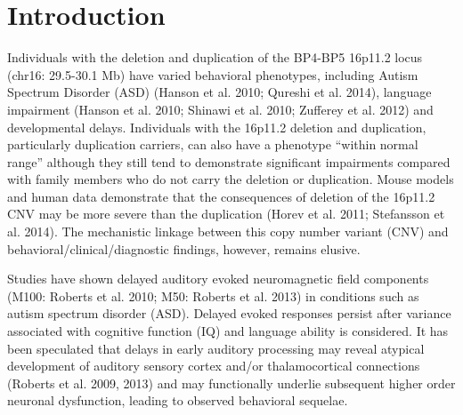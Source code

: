 \documentclass{article}
\begin{document}
\pagebreak

\section{Introduction}

Individuals with the deletion and duplication of the BP4-BP5 16p11.2 locus (chr16: 29.5-30.1 Mb) have varied behavioral phenotypes, including Autism Spectrum Disorder (ASD) (Hanson et al. 2010; Qureshi et al. 2014), language impairment (Hanson et al. 2010; Shinawi et al. 2010; Zufferey et al. 2012) and developmental delays. Individuals with the 16p11.2 deletion and duplication, particularly duplication carriers, can also have a phenotype “within normal range” although they still tend to demonstrate significant impairments compared with family members who do not carry the deletion or duplication. Mouse models and human data demonstrate that the consequences of deletion of the 16p11.2 CNV may be more severe than the duplication (Horev et al. 2011; Stefansson et al. 2014). The mechanistic linkage between this copy number variant (CNV) and behavioral/clinical/diagnostic findings, however, remains elusive.

\medskip

Studies have shown delayed auditory evoked neuromagnetic field components (M100: Roberts et al. 2010; M50: Roberts et al. 2013) in conditions such as autism spectrum disorder (ASD). Delayed evoked responses persist after variance associated with cognitive function (IQ) and language ability is considered. It has been speculated that delays in early auditory processing may reveal atypical development of auditory sensory cortex and/or thalamocortical connections (Roberts et al. 2009, 2013) and may functionally underlie subsequent higher order neuronal dysfunction, leading to observed behavioral sequelae.  

\medskip
\end{document}
